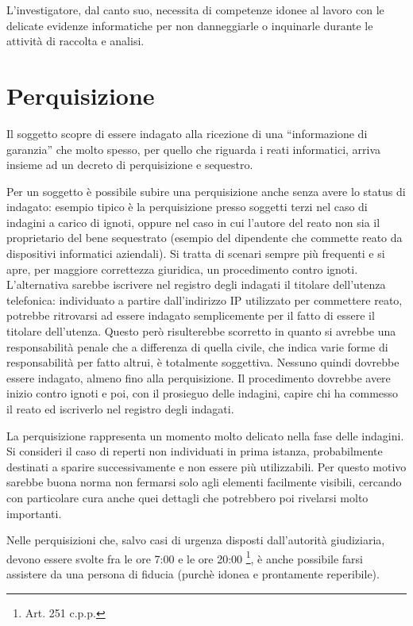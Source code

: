 L'investigatore, dal canto suo, necessita di competenze idonee al lavoro con le delicate evidenze informatiche per non danneggiarle o inquinarle durante le attività di raccolta e analisi. 

\section{Perquisizione}

Il soggetto scopre di essere indagato alla ricezione di una ``informazione di garanzia'' che molto spesso, per quello che riguarda i reati informatici, arriva insieme ad un decreto di perquisizione e sequestro.

Per un soggetto è possibile subire una perquisizione anche senza avere lo status di indagato: esempio tipico è la perquisizione presso soggetti terzi nel caso di indagini a carico di ignoti, oppure nel caso in cui l'autore del reato non sia il proprietario del bene sequestrato (esempio del dipendente che commette reato da dispositivi informatici aziendali). Si tratta di scenari sempre più frequenti e si apre, per maggiore correttezza giuridica, un procedimento contro ignoti. L'alternativa sarebbe iscrivere nel registro degli indagati il titolare dell'utenza telefonica: individuato a partire dall'indirizzo IP utilizzato per commettere reato, potrebbe ritrovarsi ad essere indagato semplicemente per il fatto di essere il titolare dell'utenza. Questo però risulterebbe scorretto in quanto si avrebbe una responsabilità penale che a differenza di quella civile, che indica varie forme di responsabilità per fatto altrui, è totalmente soggettiva. Nessuno quindi dovrebbe essere indagato, almeno fino alla perquisizione. Il procedimento dovrebbe avere inizio contro ignoti e poi, con il prosieguo delle indagini, capire chi ha commesso il reato ed iscriverlo nel registro degli indagati.  

La perquisizione rappresenta un momento molto delicato nella fase delle indagini. Si consideri il caso di reperti non individuati in prima istanza, probabilmente destinati a sparire successivamente e non essere più utilizzabili. Per questo motivo sarebbe buona norma non fermarsi solo agli elementi facilmente visibili, cercando con particolare cura anche quei dettagli che potrebbero poi rivelarsi molto importanti.

Nelle perquisizioni che, salvo casi di urgenza disposti dall'autorità giudiziaria, devono essere svolte fra le ore 7:00 e le ore 20:00 \footnote{Art. 251 c.p.p.}, è anche possibile farsi assistere da una persona di fiducia (purchè idonea e prontamente reperibile).

